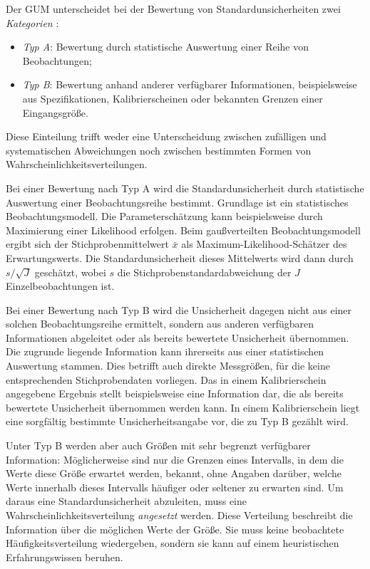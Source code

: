 Der GUM unterscheidet bei der Bewertung von Standardunsicherheiten
zwei \emph{Kategorien} \cite{GUM95}:
\begin{itemize}
\item \textsl{Typ A}: Bewertung durch statistische Auswertung einer
Reihe von Beobachtungen;
\item \textsl{Typ B}: Bewertung anhand anderer verfügbarer Informationen,
beispielsweise aus Spezifikationen, Kalibrierscheinen oder bekannten
Grenzen einer Eingangsgröße.
\end{itemize}
Diese Einteilung trifft weder eine Unterscheidung zwischen zufälligen
und systematischen Abweichungen noch zwischen bestimmten Formen
von Wahrscheinlichkeitsverteilungen.

Bei einer Bewertung nach Typ A wird die Standardunsicherheit durch
statistische Auswertung einer Beobachtungsreihe bestimmt. Grundlage
ist ein statistisches Beobachtungsmodell. Die Parameterschätzung
kann beispielsweise durch Maximierung einer Likelihood erfolgen.
Beim gaußverteilten Beobachtungsmodell ergibt sich der
Stichprobenmittelwert $\bar x$ als Maximum-Likelihood-Schätzer des
Erwartungswerts. Die Standardunsicherheit dieses
Mittelwerts wird dann durch $s/\sqrt{J}$ geschätzt, wobei $s$ die
Stichprobenstandardabweichung der $J$ Einzelbeobachtungen ist.

Bei einer Bewertung nach Typ B wird die Unsicherheit dagegen nicht
aus einer solchen Beobachtungsreihe ermittelt, sondern aus anderen 
verfügbaren Informationen abgeleitet oder
als bereits bewertete Unsicherheit übernommen. Die zugrunde
liegende Information kann ihrerseits aus einer statistischen
Auswertung stammen. Dies betrifft auch
direkte Messgrößen, für die keine entsprechenden Stichprobendaten
vorliegen. Das in einem Kalibrierschein angegebene Ergebnis stellt beispielsweise eine Information dar, die als bereits bewertete Unsicherheit übernommen werden kann. In einem Kalibrierschein liegt eine sorgfältig bestimmte
Unsicherheitsangabe vor, die zu Typ B gezählt wird.

Unter Typ B werden aber auch Größen mit sehr begrenzt verfügbarer Information:
Möglicherweise sind nur die Grenzen eines Intervalls, in dem die Werte diese Größe erwartet werden, bekannt, ohne Angaben darüber, welche Werte innerhalb dieses Intervalls häufiger oder seltener zu erwarten sind. Um daraus eine
Standardunsicherheit abzuleiten, muss eine Wahrscheinlichkeitsverteilung
\emph{angesetzt} werden. Diese Verteilung beschreibt die Information über
die möglichen Werte der Größe. Sie muss keine beobachtete
Häufigkeitsverteilung wiedergeben, sondern sie kann auf einem heuristischen Erfahrungswissen beruhen.

